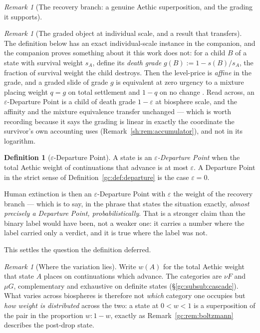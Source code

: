 \documentclass[11pt]{article}
\numberwithin{equation}{section}
\theoremstyle{plain}
\theoremstyle{definition}
\newtheorem{definition}[theorem]{Definition}
\theoremstyle{remark}
\newtheorem{remark}[theorem]{Remark}
\begin{document}
\begin{remark}[The recovery branch: a genuine Aethic superposition,
and the grading it supports]
\begin{remark}[The graded object at individual scale, and a result that
transfers]\label{gc:rem:deathgrade}
The definition below has an exact individual-scale instance in the
companion, and the companion proves something about it this work does
not: for a child $B$ of a state with survival weight $s_A$, define its
\emph{death grade} $g(B):=1-s(B)/s_A$, the fraction of survival weight
the child destroys. Then the level-price is \emph{affine} in the grade,
and a graded slide of grade $g$ is equivalent at zero urgency to a
mixture placing weight $q=g$ on total settlement and $1-q$ on no change
\cite{Aethus}. Read across, an $\varepsilon$-Departure Point is a child of
death grade $1-\varepsilon$ at biosphere scale, and the affinity and the
mixture equivalence transfer unchanged --- which is worth recording
because it says the grading is linear in exactly the coordinate the
survivor's own accounting uses (Remark~\ref{sh:rem:accumulator}), and
not in its logarithm.
\end{remark}

\begin{definition}[$\varepsilon$-Departure Point]\label{gc:def:epsdep}
A state is an \emph{$\varepsilon$-Departure Point} when the total
Aethic weight of continuations that advance is at most $\varepsilon$. A
Departure Point in the strict sense of
Definition~\ref{gc:def:departure} is the case $\varepsilon=0$.
\end{definition}

Human extinction is then an $\varepsilon$-Departure Point with
$\varepsilon$ the weight of the recovery branch --- which is to say,
in the phrase that states the situation exactly, \emph{almost precisely
a Departure Point, probabilistically}. That is a stronger claim than
the binary label would have been, not a weaker one: it carries a
number where the label carried only a verdict, and it is true where the
label was not.

This settles the question the definition deferred.

\begin{remark}[Where the variation lies]\label{gc:rem:pairsuffices}
Write $w(A)$ for the total Aethic weight that state $A$ places on
continuations which advance. The categories are $\nu F$ and $\mu G$,
complementary and exhaustive on definite states
(\S\ref{gc:subsub:cascade}). What varies across biospheres is therefore
not \emph{which} category one occupies but \emph{how weight is
distributed} across the two: a state at $0<w<1$ is a superposition of
the pair in the proportion $w:1-w$, exactly as
Remark~\ref{gc:rem:boltzmann} describes the post-drop state.


\end{remark}
\end{remark}
\end{document}
